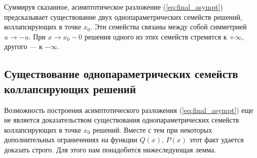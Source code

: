 Суммируя сказанное, асимптотическое разложение (\ref{eq:final_asympt}) предсказывает существование двух однопараметрических семейств решений, коллапсирующих в точке $x_0$.
Эти семейства связаны между собой симметрией $u \to -u$.
При $x \to x_0 - 0$ решения одного из этих семейств стремятся к $+\infty$, другого --- к $-\infty$.

\subsection{Существование однопараметрических семейств коллапсирующих решений}

Возможность построения асимптотического разложения (\ref{eq:final_asympt}) еще не является доказательством существования однопараметрических семейств коллапсирующих в точке $x_0$ решений.
Вместе с тем при некоторых дополнительных ограничениях на функции $Q(x)$, $P(x)$ этот факт удается доказать строго.
Для этого нам понадобится нижеследующая лемма.

